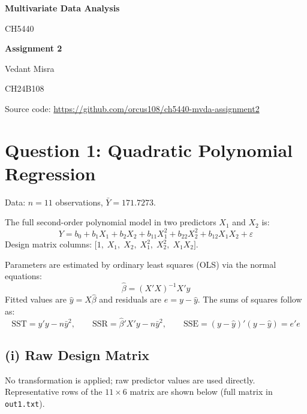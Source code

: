 \documentclass[12pt,a4paper]{article}
\begin{document}
\begin{titlepage}
  \centering
  \vspace*{3cm}
  {\LARGE\bfseries Multivariate Data Analysis\par}
  \vspace{0.4cm}
  {\large CH5440\par}
  \vspace{1.8cm}
  {\huge\bfseries Assignment 2\par}
  \vspace{2.2cm}
  {\Large Vedant Misra\par}
  \vspace{0.8cm}
  {\large CH24B108\par}
  \vfill
  {\small Source code: \url{https://github.com/orcus108/ch5440-mvda-assignment2}\par}
  \vspace{0.5cm}
\end{titlepage}

\tableofcontents
\clearpage

\section{Question 1: Quadratic Polynomial Regression}

Data: $n = 11$ observations, $\bar{Y} = 171.7273$.

The full second-order polynomial model in two predictors $X_1$ and $X_2$ is:
\[
  Y = b_0 + b_1 X_1 + b_2 X_2 + b_{11}X_1^2 + b_{22}X_2^2 + b_{12}X_1 X_2 + \varepsilon
\]
Design matrix columns: $\bigl[1,\; X_1,\; X_2,\; X_1^2,\; X_2^2,\; X_1 X_2\bigr]$.

Parameters are estimated by ordinary least squares (OLS) via the normal equations:
\[
  \hat{\beta} = (X'X)^{-1}X'y
\]
Fitted values are $\hat{y} = X\hat{\beta}$ and residuals are $e = y - \hat{y}$.
The sums of squares follow as:
\[
  \text{SST} = y'y - n\bar{y}^2, \qquad
  \text{SSR} = \hat{\beta}'X'y - n\bar{y}^2, \qquad
  \text{SSE} = (y-\hat{y})'(y-\hat{y}) = e'e
\]

\subsection{(i) Raw Design Matrix}

No transformation is applied; raw predictor values are used directly.
Representative rows of the $11 \times 6$ matrix are shown below (full matrix in \texttt{out1.txt}).
\end{document}
